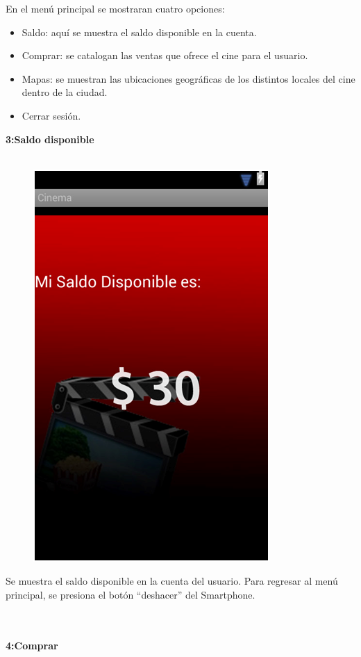 \documentclass[20pt]{article}
\begin{document}
En el menú principal se mostraran cuatro opciones: 

\begin{itemize}
\item Saldo: aquí se muestra el saldo disponible en la cuenta.
\item Comprar: se catalogan las ventas que ofrece el cine para el usuario.
\item Mapas: se muestran las ubicaciones geográficas de los distintos locales del cine dentro de la ciudad.
\item Cerrar sesión.
\end{itemize}



\begin{large}
\textbf{3:Saldo disponible}\\\
\end{large}

\begin{figure}[h]
\begin{center}
\includegraphics[width=100 pt]{./saldo_disponible.jpg}
\end{center}
\end{figure}

Se muestra el saldo disponible en la cuenta del usuario.
Para regresar al menú principal, se presiona el botón “deshacer” del Smartphone.\\\\\\

\begin{large}
\textbf{4:Comprar}\\\
\end{large}
\end{document}
